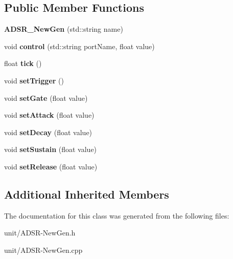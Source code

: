 \subsection*{Public Member Functions}
\begin{DoxyCompactItemize}
\item 
{\bfseries A\+D\+S\+R\+\_\+\+New\+Gen} (std\+::string name)\hypertarget{classunit_1_1ADSR__NewGen_ac8dbe9f3fab627d291ed34996e97d73e}{}\label{classunit_1_1ADSR__NewGen_ac8dbe9f3fab627d291ed34996e97d73e}

\item 
void {\bfseries control} (std\+::string port\+Name, float value)\hypertarget{classunit_1_1ADSR__NewGen_ae5d3a6e3e2be04a470eeb30767e11a58}{}\label{classunit_1_1ADSR__NewGen_ae5d3a6e3e2be04a470eeb30767e11a58}

\item 
float {\bfseries tick} ()\hypertarget{classunit_1_1ADSR__NewGen_a9ec42e7edded490dbe69cbe93883b168}{}\label{classunit_1_1ADSR__NewGen_a9ec42e7edded490dbe69cbe93883b168}

\item 
void {\bfseries set\+Trigger} ()\hypertarget{classunit_1_1ADSR__NewGen_af3002642e550abcfe4be667d027670a9}{}\label{classunit_1_1ADSR__NewGen_af3002642e550abcfe4be667d027670a9}

\item 
void {\bfseries set\+Gate} (float value)\hypertarget{classunit_1_1ADSR__NewGen_a222a12be57cca522ece84deac512c330}{}\label{classunit_1_1ADSR__NewGen_a222a12be57cca522ece84deac512c330}

\item 
void {\bfseries set\+Attack} (float value)\hypertarget{classunit_1_1ADSR__NewGen_aa725e7a7c15ac05c643f3a9df9542c66}{}\label{classunit_1_1ADSR__NewGen_aa725e7a7c15ac05c643f3a9df9542c66}

\item 
void {\bfseries set\+Decay} (float value)\hypertarget{classunit_1_1ADSR__NewGen_aa43684929b80892b7d91ec75303fd00c}{}\label{classunit_1_1ADSR__NewGen_aa43684929b80892b7d91ec75303fd00c}

\item 
void {\bfseries set\+Sustain} (float value)\hypertarget{classunit_1_1ADSR__NewGen_a91036e95f48e88f71973dced76097563}{}\label{classunit_1_1ADSR__NewGen_a91036e95f48e88f71973dced76097563}

\item 
void {\bfseries set\+Release} (float value)\hypertarget{classunit_1_1ADSR__NewGen_af7e268918cef20f67514df7356f0fb15}{}\label{classunit_1_1ADSR__NewGen_af7e268918cef20f67514df7356f0fb15}

\end{DoxyCompactItemize}
\subsection*{Additional Inherited Members}


The documentation for this class was generated from the following files\+:\begin{DoxyCompactItemize}
\item 
unit/A\+D\+S\+R-\/\+New\+Gen.\+h\item 
unit/A\+D\+S\+R-\/\+New\+Gen.\+cpp\end{DoxyCompactItemize}
